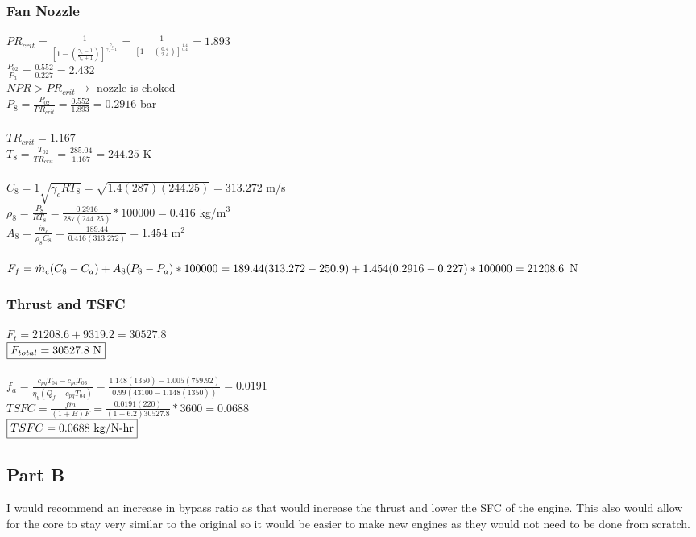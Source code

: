\documentclass{article}
\begin{document}
\subsubsection*{Fan Nozzle}
$PR_{crit}=\frac{1}{[1-(\frac{\gamma_c-1}{\gamma_c+1})]
^\frac{\gamma_c}{\gamma_c-1}}=\frac{1}{[1-(\frac{0.4}{2.4})]
^\frac{1.4}{0.4}}=1.893$ \\
$\frac{P_{02}}{P_a}=\frac{0.552}{0.227}=2.432$ \\
$NPR>PR_{crit} \rightarrow$ nozzle is choked \\
$P_8=\frac{P_{02}}{PR_{crit}}=\frac{0.552}{1.893}=0.2916$ bar \\\\
$TR_{crit}=1.167$ \\
$T_8=\frac{T_{02}}{TR_{crit}}=\frac{285.04}{1.167}=244.25$ K \\\\
$C_8=1\sqrt{\gamma_c RT_8}=\sqrt{1.4(287)(244.25)}=313.272$ m/s \\
$\rho_8=\frac{P_8}{RT_8}=\frac{0.2916}{287(244.25)}*100000=0.416$ kg/m$^3$ \\
$A_8=\frac{\dot{m}_c}{\rho_8C_8}=\frac{189.44}{0.416(313.272)}=1.454$ m$^2$ \\\\
$F_f=\dot{m}_c(C_8-C_a)+A_8(P_8-P_a)*100000=\\
189.44(313.272-250.9)+1.454(0.2916-0.227)*100000=21208.6$ N

\subsubsection*{Thrust and TSFC}
$F_t=21208.6+9319.2=30527.8$ \\
$\fbox{$F_{total}=30527.8$ N}$ \\\\
$f_a=\frac{c_{pg}T_{04}-c_{pc}T_{03}}{\eta_b(Q_f-c_{pg}T_{04})}=\frac{1.148(1350)
-1.005(759.92)}{0.99(43100-1.148(1350))}=0.0191$ \\
$TSFC=\frac{f\dot{m}}{(1+B)F}=\frac{0.0191(220)}{(1+6.2)30527.8}*3600=0.0688$ \\
$\fbox{$TSFC=0.0688$ kg/N-hr}$

\subsection*{Part B}
I would recommend an increase in bypass ratio as that would increase the thrust and lower
the SFC of the engine. This also would allow for the core to stay very similar to the
original so it would be easier to make new engines as they would not need to be
done from scratch.
\end{document}
